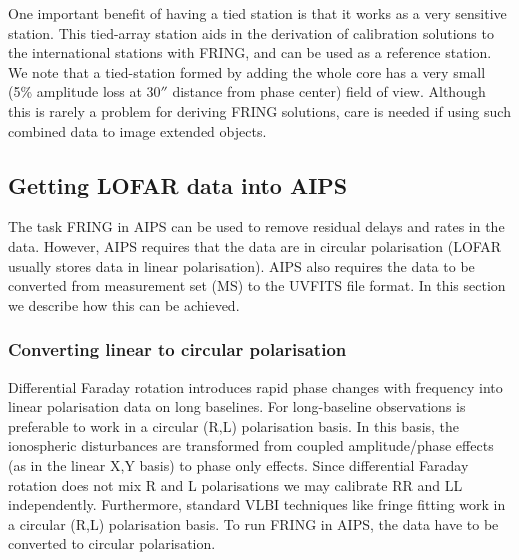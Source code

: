 \documentclass[graybox]{svmult}
\begin{document}
One important benefit of having a tied station is that it works as a very
sensitive station. This tied-array station aids in the derivation of calibration
solutions to the international stations with FRING, and can be used as a
reference station. We note that a tied-station formed by adding the whole core
has a very small (5\% amplitude loss at 30$''$ distance from phase center) field
of view. Although this is rarely a problem for deriving FRING solutions, care is
needed if using such combined data to image extended objects.



\subsection{Getting LOFAR data into AIPS}
The task FRING in AIPS can be used to remove residual delays and rates in the
data. However, AIPS requires that the data are in circular polarisation (LOFAR
usually stores data in linear polarisation). AIPS also requires the
data to be converted from measurement set (MS) to the UVFITS file format.
In this section we describe how this can be achieved. 

\subsubsection{Converting linear to circular polarisation}

Differential Faraday rotation introduces rapid phase changes with frequency
into linear polarisation data on long baselines. For long-baseline observations
is preferable to work in a circular (R,L) polarisation basis. In this basis,
the ionospheric disturbances are transformed from coupled amplitude/phase
effects (as in the linear X,Y basis) to phase only effects. Since differential
Faraday rotation does not mix R and L polarisations we may calibrate RR and LL
independently. Furthermore, standard VLBI techniques like fringe fitting work
in a circular (R,L) polarisation basis. To run FRING in AIPS, the data have to be
converted to circular polarisation.
\end{document}
